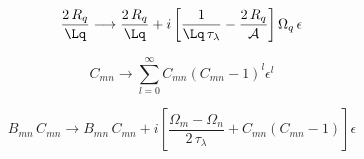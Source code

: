\begin{equation}
  \frac{2\, R_q}{\Lq} \longrightarrow \frac{2\, R_q}{\Lq} + i \left[ \frac{1}{\Lq\, \tau_\lambda} - \frac{2\, R_q}{\mathcal{A}} \right] \Omega_q\, \epsilon
\end{equation}

\begin{equation}
  C_{m n} \longrightarrow \sum_{l = 0}^\infty C_{m n} \left(C_{m n} - 1\right)^l \epsilon^l
\end{equation}

\begin{equation}
  B_{m n}\, C_{m n} \longrightarrow B_{m n}\, C_{m n} + i \left[ \frac{\Omega_m - \Omega_n}{2\, \tau_\lambda} + C_{m n} \left(C_{m n} - 1\right) \right] \epsilon
\end{equation}


